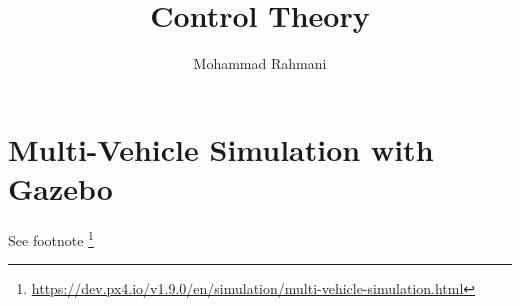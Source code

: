 \documentclass{article}
\begin{document}
	
	\title{Control Theory}
	\author{Mohammad Rahmani}
	\date{}
	\maketitle
	\section{Multi-Vehicle Simulation with Gazebo}
	See footnote \footnote{\url{https://dev.px4.io/v1.9.0/en/simulation/multi-vehicle-simulation.html}}
	
\end{document}
